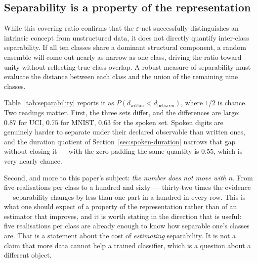 \documentclass[10pt]{article}
\theoremstyle{plain}
\theoremstyle{definition}
\theoremstyle{remark}
\newcommand{\fitwidth}[1]{%
  \resizebox{\ifdim\width>\linewidth\linewidth\else\width\fi}{!}{#1}}
\begin{document}
\subsection{Separability is a property of the representation}

While this covering ratio confirms that the $\varepsilon$-net successfully
distinguishes an intrinsic concept from unstructured data, it does not directly
quantify inter-class separability. If all ten classes share a dominant structural
component, a random ensemble will come out nearly as narrow as one class, driving the ratio toward unity without reflecting true class
overlap. A robust measure of separability must evaluate the distance between each
class and the union of the remaining nine classes.

Table~\ref{tab:separability} reports it as
$P(d_{\mathrm{within}} < d_{\mathrm{between}})$, where $1/2$ is chance. Two
readings matter. First, the three sets differ, and the differences are large:
$0.87$ for UCI, $0.75$ for MNIST, $0.63$ for the spoken set. Spoken digits are
genuinely harder to separate under their declared observable than written ones,
and the duration quotient of Section~\ref{sec:spoken-duration} narrows that gap
without closing it --- with the zero padding the same quantity is $0.55$, which
is very nearly chance.

Second, and more to this paper's subject: \emph{the number does not move with
$n$}. From five realisations per class to a hundred and sixty --- thirty-two
times the evidence --- separability changes by less than one part in a hundred
in every row. This is what one should expect of a property of the
representation rather than of an estimator that improves, and it is worth
stating in the direction that is useful: five realisations per class are
already enough to know how separable one's classes are. That is a statement
about the cost of \emph{estimating} separability. It is not a claim that more
data cannot help a trained classifier, which is a question about a different
object.

\begin{table}[!htbp]\centering\small
\fitwidth{}
\caption{\small Each class against the other nine.
$P(d_{\mathrm{within}} < d_{\mathrm{between}})$, mean over the ten classes,
against the number of realisations per class; $0.5$ is chance. The spoken set
is shown under both observables. The last two columns are the within- and
between-class median distances at the largest $n$: for the zero-padded spoken
set they are $0.025$ and $0.028$, which is the collapse in one line.}
\label{tab:separability}
\end{table}
\end{document}
